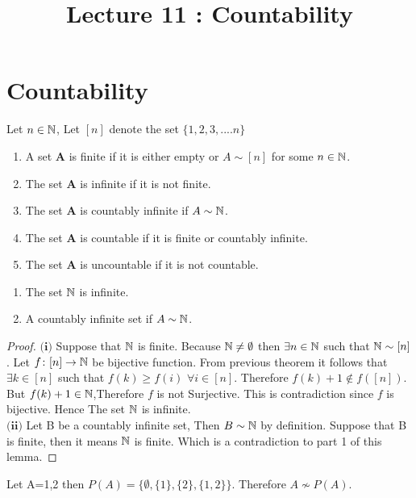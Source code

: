 \documentclass[a4paper,english,12pt]{article}   	%
\title{Lecture 11 : Countability}
\author{}
\begin{document}
\maketitle

\section{Countability}
\begin{defn} Let $n \in \mathbb{N}$, Let $[n]$ denote the set $\{1,2,3,....n\}$
\begin{enumerate}
\item A set $\textbf{A}$ is finite if it is either empty or $A \sim [n]$ for some $n \in \mathbb{N}$.
\item The set $\textbf{A}$ is infinite if it is not finite.
\item The set $\textbf{A}$ is countably infinite if $A \sim \mathbb{N}$.
\item The set $\textbf{A}$ is countable if it is finite or countably infinite.
\item The set $\textbf{A}$ is uncountable if it is not countable.
\end{enumerate}
\end{defn}
\begin{lem} 
\begin{enumerate}
\item The set $\mathbb{N}$ is infinite.
\item A countably infinite set if $A \sim \mathbb{N}$.
\end{enumerate}
\end{lem}
\begin{proof} $\textbf{(i)}$ Suppose that $\mathbb{N}$ is finite. Because $\mathbb{N} \neq \emptyset$ then $\exists n \in \mathbb{N}$ such that $\mathbb{N} \sim [n]$.
Let $f \colon [n] \to \mathbb{N}$ be bijective function. From previous theorem it follows that $\exists k \in [n]$ such that $f(k) \geq f(i) $ $\forall i \in [n]$. Therefore 
$f(k)+1 \notin f([n])$. But $f(k)+1 \in \mathbb{N}$,Therefore $f$ is not Surjective. This is contradiction since $f$ is bijective. Hence The set $\mathbb{N}$ is infinite.\\
$\textbf{(ii)}$ Let B be a countably infinite set, Then $B \sim \mathbb{N}$ by definition. Suppose that B is finite, then it means  $\mathbb{N}$ is finite. Which is a contradiction to part 1 of this lemma.
\end{proof} 
\begin{exmp} Let A={1,2} then $P(A)=\{ \emptyset,\{1\},\{2\},\{1,2\}\}$. Therefore $A \nsim P(A) $.
\end{exmp}
\end{document}
